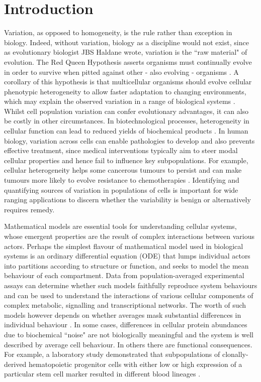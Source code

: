 \section{Introduction}
Variation, as opposed to homogeneity, is the rule rather than exception in biology. Indeed, without variation, biology as a discipline would not exist, since as evolutionary biologist JBS Haldane wrote, variation is the ``raw material" of evolution. The Red Queen Hypothesis asserts organisms must continually evolve in order to survive when pitted against other - also evolving - organisms \cite{ridley1994red}. A corollary of this hypothesis is that multicellular organisms should evolve cellular phenotypic heterogeneity to allow faster adaptation to changing environments, which may explain the observed variation in a range of biological systems \cite{fraser2009chance}. Whilst cell population variation can confer evolutionary advantages, it can also be costly in other circumstances. In biotechnological processes, heterogeneity in cellular function can lead to reduced yields of biochemical products \cite{delvigne2014metabolic}. In human biology, variation across cells can enable pathologies to develop and also prevents effective treatment, since medical interventions typically aim to steer modal cellular properties and hence fail to influence key subpopulations. For example, cellular heterogeneity helps some cancerous tumours to persist \cite{gatenby2007cellular} and can make tumours more likely to evolve resistance to chemotherapies \cite{altrock2015mathematics}. Identifying and quantifying sources of variation in populations of cells is important for wide ranging applications to discern whether the variability is benign or alternatively requires remedy.

Mathematical models are essential tools for understanding cellular systems, whose emergent properties are the result of complex interactions between various actors. Perhaps the simplest flavour of mathematical model used in biological systems is an ordinary differential equation (ODE) that lumps individual actors into partitions according to structure or function, and seeks to model the mean behaviour of each compartment. Data from population-averaged experimental assays can determine whether such models faithfully reproduce system behaviours and can be used to understand the interactions of various cellular components of complex metabolic, signalling and transcriptional networks. The worth of such models however depends on whether averages mask substantial differences in individual behaviour \cite{altschuler2010cellular}. In some cases, differences in cellular protein abundances due to biochemical ``noise" are not biologically meaningful  \cite{elowitz2002stochastic} and the system is well described by average cell behaviour. In others there are functional consequences. For example, a laboratory study demonstrated that subpopulations of clonally-derived hematopoietic progenitor cells with either low or high expression of a particular stem cell marker resulted in different blood lineages \cite{chang2008transcriptome}.

